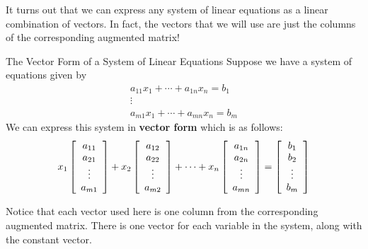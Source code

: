 It turns out that we can express any system of linear equations as a linear combination of vectors. In fact,
the vectors that we will use are just the columns of the corresponding augmented matrix! 

\begin{definition}{The Vector Form of a System of Linear Equations}\label{def:vectorform}
Suppose we have a system of equations given by
\begin{equation*}
\begin{array}{c}
a_{11}x_{1}+\cdots +a_{1n}x_{n}=b_{1} \\
\vdots \\
a_{m1}x_{1}+\cdots +a_{mn}x_{n}=b_{m}
\end{array}
\end{equation*}
We can express this system in \textbf{vector form}  which is as follows:
\begin{equation*}
x_1
\left[
\begin{array}{c}
a_{11}\\
a_{21}\\
\vdots \\
a_{m1}
\end{array}
\right]
+
x_2
\left[
\begin{array}{c}
a_{12}\\
a_{22}\\
\vdots \\
a_{m2}
\end{array}
\right]
+
\cdots
+
x_n
\left[
\begin{array}{c}
a_{1n}\\
a_{2n}\\
\vdots \\
a_{mn}
\end{array}
\right]
=
\left[
\begin{array}{c}
b_1\\
b_2\\
\vdots \\
b_m
\end{array}
\right]
\end{equation*}
\end{definition}

Notice that each vector used here is one column from the corresponding augmented  matrix. There is one vector for each variable in the system,
along with the constant vector. 

